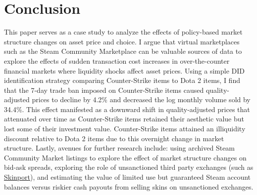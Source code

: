 \documentclass[12pt,letterpaper]{article}
\begin{document}
\section{Conclusion}
This paper serves as a case study to analyze the effects of policy-based market structure changes on asset price and choice. I argue that virtual marketplaces such as the Steam Community Marketplace can be valuable sources of data to explore the effects of sudden transaction cost increases in over-the-counter financial markets where liquidity shocks affect asset prices. Using a simple DID identification strategy comparing Counter-Strike items to Dota 2 items, I find that the 7-day trade ban imposed on Counter-Strike items caused quality-adjusted prices to decline by 4.2\% and decreased the log monthly volume sold by 34.4\%. This effect manifested as a downward shift in quality-adjusted prices that attenuated over time as Counter-Strike items retained their aesthetic value but lost some of their investment value. Counter-Strike items attained an illiquidity discount relative to Dota 2 items due to this overnight change in market structure. Lastly, avenues for further research include: using archived Steam Community Market listings to explore the effect of market structure changes on bid-ask spreads, exploring the role of unsanctioned third party exchanges (such as \textcolor{blue}{\href{https://skinport.com/}{Skinport}}), and estimating the value of limited use but guaranteed Steam account balances versus riskier cash payouts from selling skins on unsanctioned exchanges. \\

%
\printbibliography
\clearpage
\end{document}

